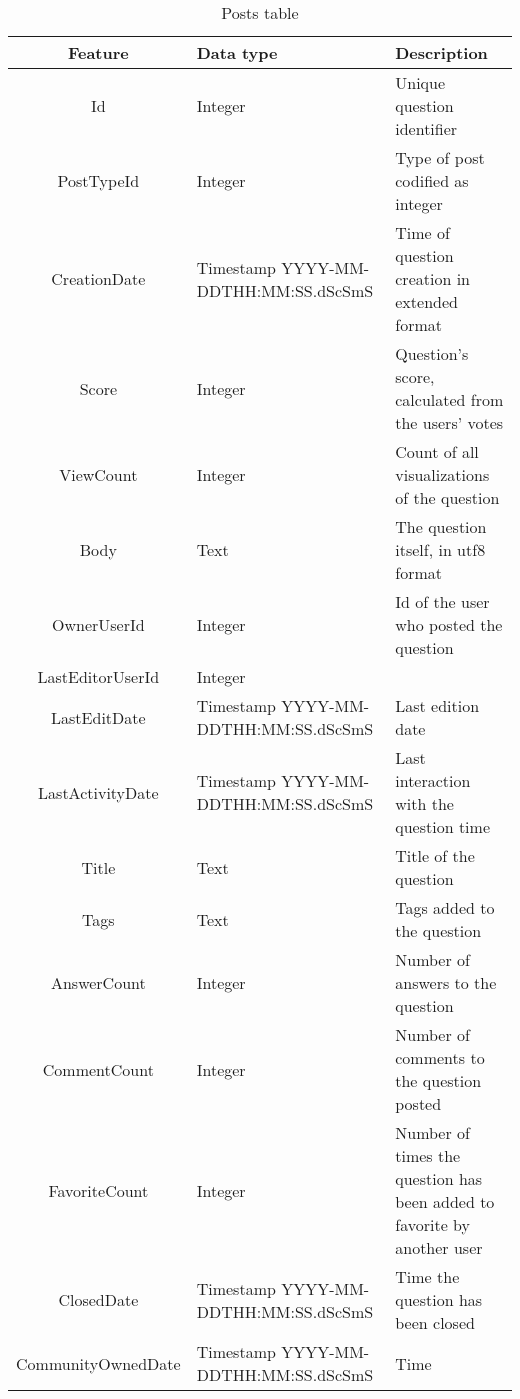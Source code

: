 \documentclass[11pt]{article} %
\begin{document}
      \begin{table}[!h]
        \centering
        \begin{tabular}{|c|p{}|p{}|}
          \hline

          Feature & Data type & Description \\ \hline
          Id & Integer & Unique question identifier \\ \hline
          PostTypeId & Integer & Type of post codified as integer \\ \hline
          CreationDate & Timestamp YYYY-MM-DDTHH:MM:SS.dScSmS & Time of question creation in extended format \\ \hline
          Score & Integer & Question's score, calculated from the users' votes \\ \hline
          ViewCount & Integer & Count of all visualizations of the question \\ \hline
          Body & Text & The question itself, in utf8 format \\ \hline
          OwnerUserId & Integer & Id of the user who posted the question \\ \hline
          LastEditorUserId & Integer & \\ \hline
          LastEditDate & Timestamp YYYY-MM-DDTHH:MM:SS.dScSmS & Last edition date \\ \hline
          LastActivityDate & Timestamp YYYY-MM-DDTHH:MM:SS.dScSmS & Last interaction with the question time \\ \hline
          Title & Text & Title of the question \\ \hline
          Tags & Text & Tags added to the question \\ \hline
          AnswerCount & Integer & Number of answers to the question \\ \hline
          CommentCount & Integer & Number of comments to the question posted \\ \hline
          FavoriteCount & Integer & Number of times the question has been added to favorite by another user \\ \hline
          ClosedDate & Timestamp YYYY-MM-DDTHH:MM:SS.dScSmS & Time the question has been closed \\ \hline
          CommunityOwnedDate & Timestamp YYYY-MM-DDTHH:MM:SS.dScSmS & Time \\

          \hline
        \end{tabular}
        \caption{Posts table}
        \label{tab:posts}
      \end{table}
\end{document}
